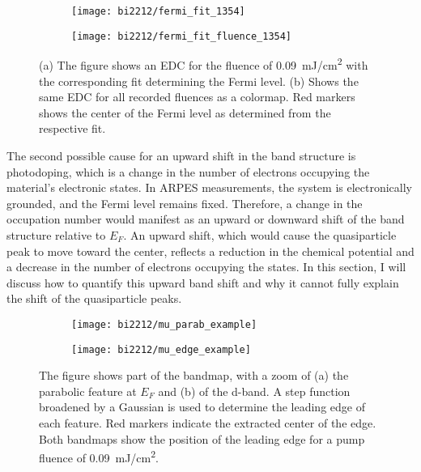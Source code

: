 \begin{figure}[t]
	\centering
	\begin{subfigure}[b]{0.33\textwidth}
		\texttt{[image: bi2212/fermi\_fit\_1354]}
		\caption{}
	\end{subfigure}
	\begin{subfigure}[b]{0.33\textwidth}
		\texttt{[image: bi2212/fermi\_fit\_fluence\_1354]}
		\caption{}
	\end{subfigure}
	\caption{(a) The figure shows an EDC for the fluence of \qty{0.09}{\milli\joule/\centi\meter\squared} with the corresponding fit determining the Fermi level. (b) Shows the same EDC for all recorded fluences as a colormap. Red markers shows the center of the Fermi level as determined from the respective fit.}
	\label{fig:fermi_fit_bi2212}
\end{figure}

The second possible cause for an upward shift in the band structure is photodoping, which is a change in the number of electrons occupying the material’s electronic states.
In ARPES measurements, the system is electronically grounded, and the Fermi level remains fixed.
Therefore, a change in the occupation number would manifest as an upward or downward shift of the band structure relative to $E_F$.
An upward shift, which would cause the quasiparticle peak to move toward the center, reflects a reduction in the chemical potential and a decrease in the number of electrons occupying the states.
In this section, I will discuss how to quantify this upward band shift and why it cannot fully explain the shift of the quasiparticle peaks.

\begin{figure}[b!]
	\centering
	\begin{subfigure}[b]{0.27\textwidth}
		\texttt{[image: bi2212/mu\_parab\_example]}
		\caption{}
	\end{subfigure}
	\begin{subfigure}[b]{0.33\textwidth}
		\texttt{[image: bi2212/mu\_edge\_example]}
		\caption{}
	\end{subfigure}
	\caption{The figure shows part of the bandmap, with a zoom of (a) the parabolic feature at $E_F$ and (b) of the  d-band. A step function broadened by a Gaussian is used to determine the leading edge of each feature. Red markers indicate the extracted center of the edge. Both bandmaps show the position of the leading edge for a pump fluence of \qty{0.09}{\milli\joule/\centi\meter\squared}.}
	\label{fig:mu_center}
\end{figure}

